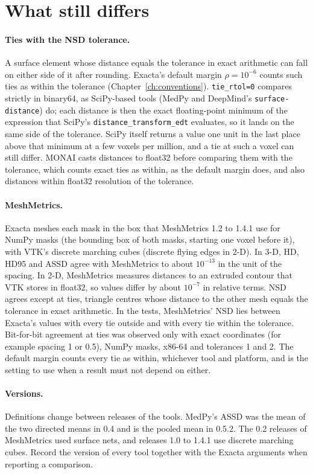 \section{What still differs}\label{tools:differences}

\paragraph{Ties with the NSD tolerance.} A surface element whose distance equals the tolerance
in exact arithmetic can fall on either side of it after rounding. Exacta's default margin
$\rho=10^{-6}$ counts such ties as within the tolerance (Chapter~\ref{ch:conventions}).
\texttt{tie\_rtol=0} compares strictly in binary64, as SciPy-based tools (MedPy and DeepMind's
\texttt{surface-distance}) do; each distance is then the exact floating-point minimum of the
expression that SciPy's \texttt{distance\_transform\_edt} evaluates, so it lands on the same side
of the tolerance. SciPy itself returns a value one unit in the last place above that minimum at
a few voxels per million, and a tie at such a voxel can still differ. MONAI casts distances to
float32 before comparing them with the tolerance, which counts exact ties as within, as the
default margin does, and also distances within float32 resolution of the tolerance.

\paragraph{MeshMetrics.} Exacta meshes each mask in the box that MeshMetrics 1.2 to 1.4.1
use for NumPy masks (the bounding box of both masks, starting one voxel before it), with VTK's
discrete marching cubes (discrete flying edges in 2-D). In 3-D, HD, HD95 and ASSD agree with
MeshMetrics to about $10^{-13}$ in the unit of the spacing. In 2-D, MeshMetrics measures
distances to an extruded contour that VTK stores in float32, so values differ by about
$10^{-7}$ in relative terms. NSD agrees except at ties, triangle centres whose distance to the
other mesh equals the tolerance in exact arithmetic. In the tests, MeshMetrics' NSD lies
between Exacta's values with every tie outside and with every tie within the tolerance.
Bit-for-bit agreement at ties was observed only with exact coordinates (for example spacing 1
or 0.5), NumPy masks, x86-64 and tolerances 1 and 2. The default margin counts every tie as
within, whichever tool and platform, and is the setting to use when a result must not depend on
either.

\paragraph{Versions.} Definitions change between releases of the tools. MedPy's ASSD was the
mean of the two directed means in 0.4 and is the pooled mean in 0.5.2. The 0.2 releases of
MeshMetrics used surface nets, and releases 1.0 to 1.4.1 use discrete marching cubes. Record the
version of every tool together with the Exacta arguments when reporting a comparison.

